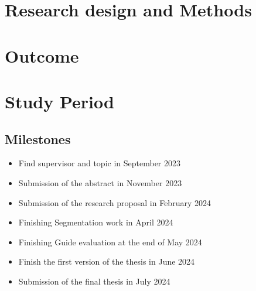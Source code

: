 \clearpage
\section{Research design and Methods}
\begin{body}
\lipsum[2-3]

\end{body}

\section{Outcome}
\begin{body}
  \lipsum[2-3]

\end{body}

\clearpage
\section{Study Period}
\subsection{Milestones}
\begin{body}
\begin{itemize}
	\item[\ding{110}] Find supervisor and topic in September 2023
	\item[\ding{110}] Submission of the abstract in November 2023
	\item[\ding{110}] Submission of the research proposal in February 2024
	\item[\ding{110}] Finishing Segmentation work in April 2024
	\item[\ding{110}] Finishing Guide evaluation at the end of May 2024
	\item[\ding{110}] Finish the first version of the thesis in June 2024
	\item[\ding{110}] Submission of the final thesis in July 2024
\end{itemize}
\end{body}

